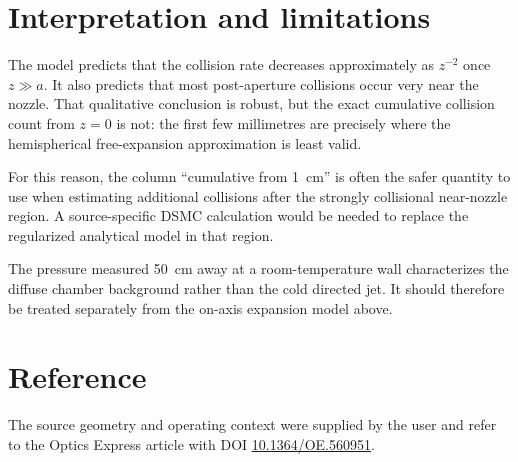 \documentclass[11pt,a4paper]{article}
\begin{document}
\section{Interpretation and limitations}
The model predicts that the collision rate decreases approximately as $z^{-2}$ once $z\gg a$. It also predicts that most post-aperture collisions occur very near the nozzle. That qualitative conclusion is robust, but the exact cumulative collision count from $z=0$ is not: the first few millimetres are precisely where the hemispherical free-expansion approximation is least valid.

For this reason, the column ``cumulative from \SI{1}{cm}'' is often the safer quantity to use when estimating additional collisions after the strongly collisional near-nozzle region. A source-specific DSMC calculation would be needed to replace the regularized analytical model in that region.

The pressure measured \SI{50}{cm} away at a room-temperature wall characterizes the diffuse chamber background rather than the cold directed jet. It should therefore be treated separately from the on-axis expansion model above.

\section{Reference}
The source geometry and operating context were supplied by the user and refer to the Optics Express article with DOI
\href{https://doi.org/10.1364/OE.560951}{10.1364/OE.560951}.
\end{document}
